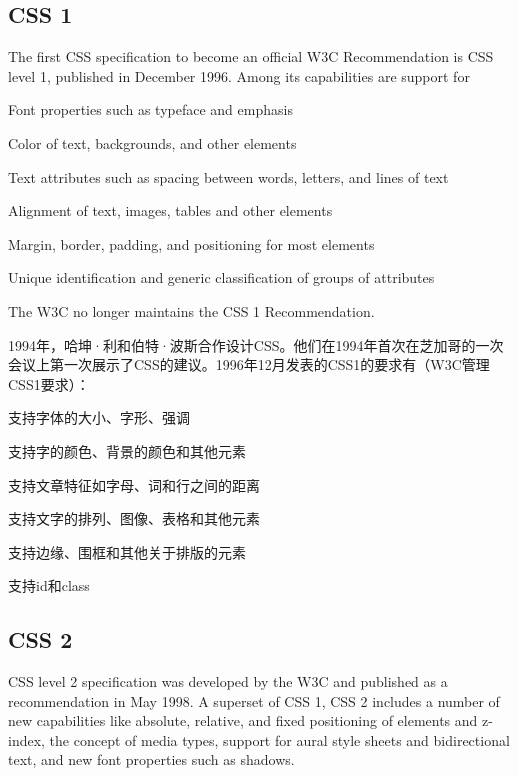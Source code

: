 \subsection{CSS 1}

The first CSS specification to become an official W3C Recommendation is CSS level 1, published in December 1996. Among its capabilities are support for

\begin{compactitem}
\item  Font properties such as typeface and emphasis
\item Color of text, backgrounds, and other elements
\item Text attributes such as spacing between words, letters, and lines of text
\item Alignment of text, images, tables and other elements
\item Margin, border, padding, and positioning for most elements
\item Unique identification and generic classification of groups of attributes
\end{compactitem}

The W3C no longer maintains the CSS 1 Recommendation.

1994年，哈坤·利和伯特·波斯合作设计CSS。他们在1994年首次在芝加哥的一次会议上第一次展示了CSS的建议。1996年12月发表的CSS1的要求有（W3C管理CSS1要求）：

\begin{compactitem}
\item 支持字体的大小、字形、强调
\item 支持字的颜色、背景的颜色和其他元素
\item 支持文章特征如字母、词和行之间的距离
\item 支持文字的排列、图像、表格和其他元素
\item 支持边缘、围框和其他关于排版的元素
\item 支持id和class
\end{compactitem}




\subsection{CSS 2}


CSS level 2 specification was developed by the W3C and published as a recommendation in May 1998. A superset of CSS 1, CSS 2 includes a number of new capabilities like absolute, relative, and fixed positioning of elements and z-index, the concept of media types, support for aural style sheets and bidirectional text, and new font properties such as shadows.

